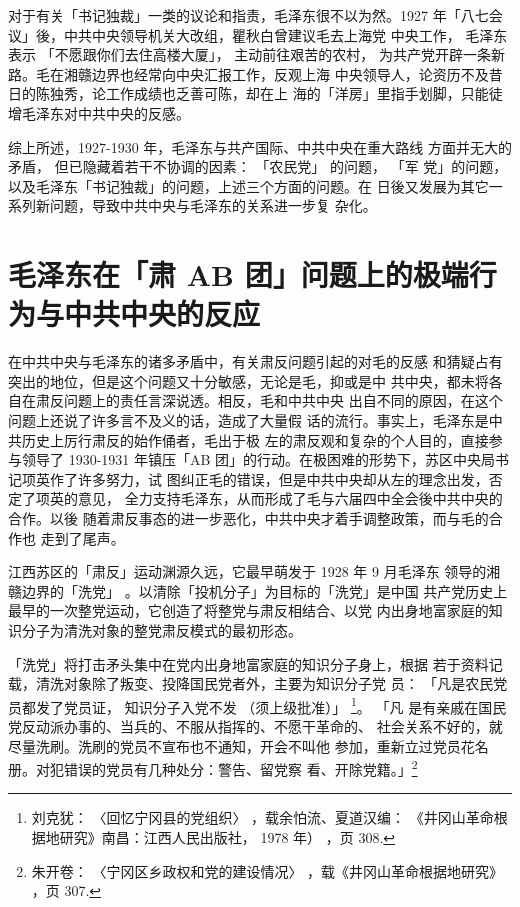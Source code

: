 对于有关「书记独裁」一类的议论和指责，毛泽东很不以为然。1927
年「八七会议」後，中共中央领导机关大改组，瞿秋白曾建议毛去上海党
中央工作，
毛泽东表示
「不愿跟你们去住高楼大厦」， 主动前往艰苦的农村，
为共产党开辟一条新路。毛在湘赣边界也经常向中央汇报工作，反观上海
中央领导人，论资历不及昔日的陈独秀，论工作成绩也乏善可陈，却在上
海的「洋房」里指手划脚，只能徒增毛泽东对中共中央的反感。

综上所述，1927-1930 年，毛泽东与共产国际、中共中央在重大路线
方面并无大的矛盾，
但已隐藏着若干不协调的因素：
「农民党」
的问题，
「军
党」的问题，以及毛泽东「书记独裁」的问题，上述三个方面的问题。在
日後又发展为其它一系列新问题，导致中共中央与毛泽东的关系进一步复
杂化。

\section{毛泽东在「肃 AB 团」问题上的极端行为与中共中央的反应}

在中共中央与毛泽东的诸多矛盾中，有关肃反问题引起的对毛的反感
和猜疑占有突出的地位，但是这个问题又十分敏感，无论是毛，抑或是中
共中央，都未将各自在肃反问题上的责任言深说透。相反，毛和中共中央
出自不同的原因，在这个问题上还说了许多言不及义的话，造成了大量假
话的流行。事实上，毛泽东是中共历史上厉行肃反的始作俑者，毛出于极
左的肃反观和复杂的个人目的，直接参与领导了 1930-1931 年镇压「AB
团」的行动。在极困难的形势下，苏区中央局书记项英作了许多努力，试
图纠正毛的错误，但是中共中央却从左的理念出发，否定了项英的意见，
全力支持毛泽东，从而形成了毛与六届四中全会後中共中央的合作。以後
随着肃反事态的进一步恶化，中共中央才着手调整政策，而与毛的合作也
走到了尾声。

江西苏区的「肃反」运动渊源久远，它最早萌发于 1928 年 9 月毛泽东
领导的湘赣边界的「洗党」
。以清除「投机分子」为目标的「洗党」是中国
共产党历史上最早的一次整党运动，它创造了将整党与肃反相结合、以党
内出身地富家庭的知识分子为清洗对象的整党肃反模式的最初形态。

「洗党」将打击矛头集中在党内出身地富家庭的知识分子身上，根据
若于资料记载，清洗对象除了叛变、投降国民党者外，主要为知识分子党
员：
「凡是农民党员都发了党员证，
知识分子入党不发
（须上级批准）」
\footnote{ 刘克犹：
〈回忆宁冈县的党组织〉
，载余怕流、夏道汉编：
《井冈山革命根据地研究》南昌：江西人民出版社，
1978 年）
，页 308.}。 「凡
是有亲戚在国民党反动派办事的、当兵的、不服从指挥的、不愿干革命的、
社会关系不好的，就尽量洗刷。洗刷的党员不宣布也不通知，开会不叫他
参加，重新立过党员花名册。对犯错误的党员有几种处分：警告、留党察
看、开除党籍。」\footnote{ 朱开卷：
〈宁冈区乡政权和党的建设情况〉
，载《井冈山革命根据地研究》
，页 307.} 

